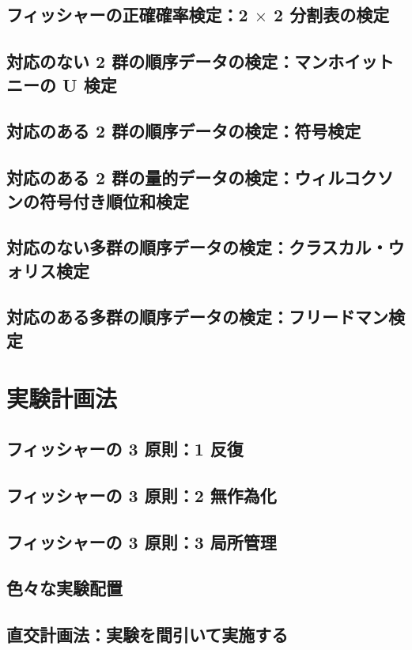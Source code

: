 \section{フィッシャーの正確確率検定：2 $\times$ 2 分割表の検定}
\section{対応のない 2 群の順序データの検定：マンホイットニーの U 検定}
\section{対応のある 2 群の順序データの検定：符号検定}
\section{対応のある 2 群の量的データの検定：ウィルコクソンの符号付き順位和検定}
\section{対応のない多群の順序データの検定：クラスカル・ウォリス検定}
\section{対応のある多群の順序データの検定：フリードマン検定}


\chapter{実験計画法}

\section{フィッシャーの 3 原則：1 反復}
\section{フィッシャーの 3 原則：2 無作為化}
\section{フィッシャーの 3 原則：3 局所管理}
\section{色々な実験配置}
\section{直交計画法：実験を間引いて実施する}
